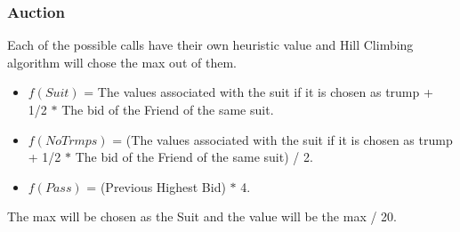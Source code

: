 \documentclass{beamer}
\begin{document}
\begin{frame}\frametitle{Auction}
    Each of the possible calls have their own heuristic value and Hill Climbing algorithm will chose the max out of them.

    \begin{itemize}
    \item $f(Suit)$ = The values associated with the suit if it is chosen as trump + 1/2 $*$ The bid of the Friend of the same suit.
    \item $f(NoTrmps)$ = (The values associated with the suit if it is chosen as trump + 1/2 $*$ The bid of the Friend of the same suit) / 2.
    \item $f(Pass)$ = (Previous Highest Bid) $*$ 4.
    \end{itemize}

    The max will be chosen as the Suit and the value will be the max / 20.

    

\end{frame}
\end{document}
